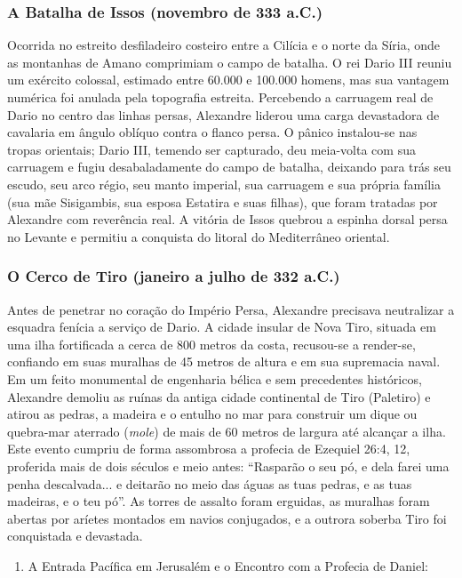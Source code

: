 \subsubsection*{A Batalha de Issos (novembro de 333 a.C.)}
Ocorrida no estreito desfiladeiro costeiro entre a Cilícia e o norte da Síria, onde as montanhas de Amano comprimiam o campo de batalha. O rei Dario III reuniu um exército colossal, estimado entre 60.000 e 100.000 homens, mas sua vantagem numérica foi anulada pela topografia estreita. Percebendo a carruagem real de Dario no centro das linhas persas, Alexandre liderou uma carga devastadora de cavalaria em ângulo oblíquo contra o flanco persa. O pânico instalou-se nas tropas orientais; Dario III, temendo ser capturado, deu meia-volta com sua carruagem e fugiu desabaladamente do campo de batalha, deixando para trás seu escudo, seu arco régio, seu manto imperial, sua carruagem e sua própria família (sua mãe Sisigambis, sua esposa Estatira e suas filhas), que foram tratadas por Alexandre com reverência real. A vitória de Issos quebrou a espinha dorsal persa no Levante e permitiu a conquista do litoral do Mediterrâneo oriental.


\subsubsection*{O Cerco de Tiro (janeiro a julho de 332 a.C.)}
Antes de penetrar no coração do Império Persa, Alexandre precisava neutralizar a esquadra fenícia a serviço de Dario. A cidade insular de Nova Tiro, situada em uma ilha fortificada a cerca de 800 metros da costa, recusou-se a render-se, confiando em suas muralhas de 45 metros de altura e em sua supremacia naval. Em um feito monumental de engenharia bélica e sem precedentes históricos, Alexandre demoliu as ruínas da antiga cidade continental de Tiro (Paletiro) e atirou as pedras, a madeira e o entulho no mar para construir um dique ou quebra-mar aterrado (\textit{mole}) de mais de 60 metros de largura até alcançar a ilha. Este evento cumpriu de forma assombrosa a profecia de Ezequiel 26:4, 12, proferida mais de dois séculos e meio antes: ``Rasparão o seu pó, e dela farei uma penha descalvada... e deitarão no meio das águas as tuas pedras, e as tuas madeiras, e o teu pó''. As torres de assalto foram erguidas, as muralhas foram abertas por aríetes montados em navios conjugados, e a outrora soberba Tiro foi conquistada e devastada.

\begin{enumerate}
  \item A Entrada Pacífica em Jerusalém e o Encontro com a Profecia de Daniel:
\end{enumerate}

